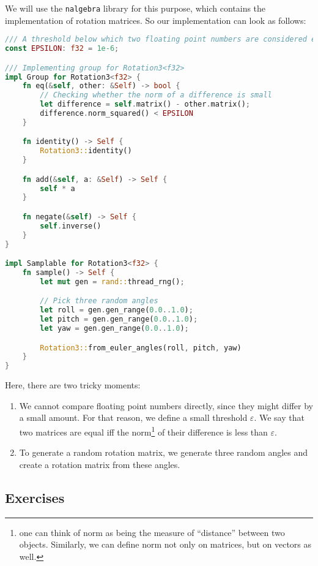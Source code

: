 \documentclass[../lecture-notes-148x210.tex]{subfiles}
\begin{document}
We will use the \texttt{nalgebra} library for this purpose, which contains the implementation of rotation matrices. So our implementation can look as follows:
\begin{lstlisting}[language=Rust]
/// A threshold below which two floating point numbers are considered equal.
const EPSILON: f32 = 1e-6;

/// Implementing group for Rotation3<f32>
impl Group for Rotation3<f32> {
    fn eq(&self, other: &Self) -> bool {
        // Checking whether the norm of a difference is small
        let difference = self.matrix() - other.matrix();
        difference.norm_squared() < EPSILON
    }

    fn identity() -> Self {
        Rotation3::identity()
    }

    fn add(&self, a: &Self) -> Self {
        self * a
    }

    fn negate(&self) -> Self {
        self.inverse()
    }
}

impl Samplable for Rotation3<f32> {
    fn sample() -> Self {
        let mut gen = rand::thread_rng();

        // Pick three random angles
        let roll = gen.gen_range(0.0..1.0);
        let pitch = gen.gen_range(0.0..1.0);
        let yaw = gen.gen_range(0.0..1.0);

        Rotation3::from_euler_angles(roll, pitch, yaw)
    }
}
\end{lstlisting}

Here, there are two tricky moments:
\begin{enumerate}
    \item We cannot compare floating point numbers directly, since they might differ by a small amount. For that reason, we define a small threshold $\varepsilon$. We say that two matrices are equal iff the norm\footnote{one can think of norm as being the measure of ``distance'' between two objects. Similarly, we can define norm not only on matrices, but on vectors as well.} of their difference is less than $\varepsilon$.
    \item To generate a random rotation matrix, we generate three random angles and create a rotation matrix from these angles.
\end{enumerate}

\subsection{Exercises}
\end{document}
